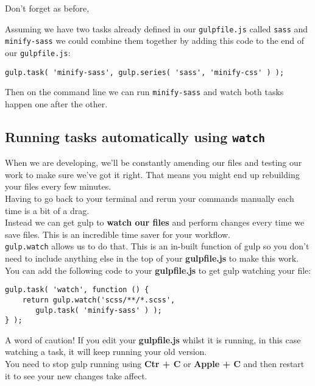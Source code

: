 Don't forget as before, 

Assuming we have two tasks already defined in our \texttt{gulpfile.js} called \texttt{sass} and \texttt{minify-sass} we could combine them together by adding this code to the end of our \texttt{gulpfile.js}:

	\begin{verbatim}
gulp.task( 'minify-sass', gulp.series( 'sass', 'minify-css' ) );
	\end{verbatim}

Then on the command line we can run \texttt{minify-sass} and watch both tasks happen one after the other.
\\


\subsection{Running tasks automatically using \texttt{watch}}

When we are developing, we'll be constantly amending our files and testing our work to make sure we've got it right. That means you might end up rebuilding your files every few minutes.
\\

Having to go back to your terminal and rerun your commands manually each time is a bit of a drag.
\\

Instead we can get gulp to \textbf{watch our files} and perform changes every time we save files. This is an incredible time saver for your workflow.
\\

\texttt{gulp.watch} allows us to do that. This is an in-built function of gulp so you don't need to include anything else in the top of your \textbf{gulpfile.js} to make this work.
\\

You can add the following code to your \textbf{gulpfile.js} to get gulp watching your file:

	\begin{verbatim}
gulp.task( 'watch', function () {
    return gulp.watch('scss/**/*.scss',
       gulp.task( 'minify-sass' ) );
} );
	\end{verbatim}

A word of caution! If you edit your \textbf{gulpfile.js} whilst it is running, in this case watching a task, it will keep running your old version.
\\

You need to stop gulp running using \textbf{Ctr + C} or \textbf{Apple + C} and then restart it to see your new changes take affect.

